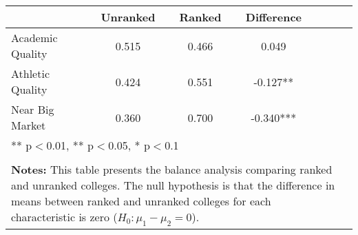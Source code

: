 \begin{tabular}{l*{6}{c}}
                    &    Unranked&      Ranked&  Difference   \\
\hline
Academic Quality    &       0.515&       0.466&       0.049   \\
Athletic Quality    &       0.424&       0.551&      -0.127** \\
Near Big Market     &       0.360&       0.700&      -0.340***\\
\multicolumn{6}{p{0.6\linewidth}}{\small *** p$<$0.01, ** p$<$0.05, * p$<$0.1} \\
\\
\multicolumn{6}{p{0.6\linewidth}}{\small \textbf{Notes:} This table presents the balance analysis comparing ranked and unranked colleges. The null hypothesis is that the difference in means between ranked and unranked colleges for each characteristic is zero ($H_0: \mu_1 - \mu_2 = 0$).} \\
\end{tabular}
